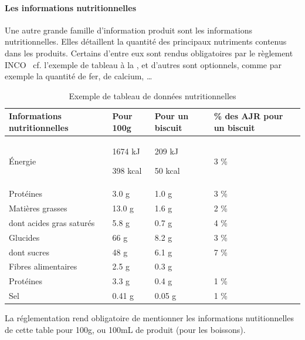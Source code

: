                 \paragraph{Les informations nutritionnelles}
                \label{donnees_nut}

                Une autre grande famille d'information produit sont les informations nutritionnelles. 
                Elles détaillent la quantité des principaux nutriments contenus dans les produits.
                Certains d'entre eux sont rendus obligatoires par le règlement INCO~\cite{incotext}\cite{incoexpl} cf. l'exemple de tableau à la , et d'autres sont optionnels, comme par exemple la quantité de fer, de calcium, \dots

                \begin{table}[htbp]
                    \begin{center}
                    \begin{tabularx}{\linewidth}{|X|X|X|X|}
                        \hline
                        \textbf{Informations nutritionnelles} & \textbf{Pour 100g} & \textbf{Pour un biscuit} & \textbf{\% des AJR pour un biscuit} \\
                        \hline
                        \'{E}nergie &1674 kJ
                        
                        398 kcal & 209 kJ
                        
                        50 kcal & 3 \% \\
                        \hline
                        Protéines & 3.0 g & 1.0 g & 3 \% \\ 
                        \hline
                        Matières grasses & 13.0 g & 1.6 g & 2 \% \\
                        \hline
                        dont acides gras saturés & 5.8 g & 0.7 g & 4 \% \\
                        \hline
                        Glucides & 66 g & 8.2 g & 3 \% \\
                        \hline
                        dont sucres & 48 g & 6.1 g & 7 \% \\
                        \hline
                        Fibres alimentaires & 2.5 g & 0.3 g &\\
                        \hline
                        Protéines & 3.3 g & 0.4 g & 1 \% \\
                        \hline
                        Sel & 0.41 g & 0.05 g & 1 \% \\
                        \hline
                    \end{tabularx}
                    \end{center}
                    \caption{Exemple de tableau de données nutritionnelles}
                    \label{tab:donnees_nut}
                \end{table}
                La réglementation rend obligatoire de mentionner les informations nutitionnelles de cette table pour 100g, ou 100mL de produit (pour les boissons).

